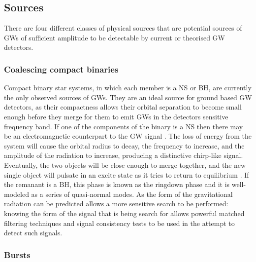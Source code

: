 \documentclass[binding=0.6cm, LaM]{sapthesis}
\begin{document}
\subsection{Sources}

	There are four different classes of physical sources 
	that are potential sources of GWs 
	of sufficient amplitude to be detectable 
	by current or theorised GW detectors. 

\subsubsection{Coalescing compact binaries}

	Compact binary star systems, in which each member is a NS or BH, 
	are currently the only observed sources of GWs.
	They are an ideal source for ground based GW detectors, 
	as their compactness allows their orbital separation to become 
	small enough before they merge for them to emit GWs in the detectors sensitive frequency band.
	If one of the components of the binary is a NS 
	then there may be an electromagnetic counterpart to the GW signal \cite{20}. 
	The loss of energy from the system will cause the orbital radius to decay, 
	the frequency to increase, and the amplitude of the radiation to increase, 
	producing a distinctive chirp-like signal. 
	Eventually, the two objects will be close enough to merge together, 
	and the new single object will pulsate in an excite state as it tries to return to equilibrium \cite{21}. 
	If the remanant is a BH, this phase is known as the ringdown phase and it is well-modeled as a series of quasi-normal modes. 
	As the form of the gravitational radiation can be predicted allows 
	a more sensitive search to be performed: knowing the form of the signal 
	that is being search for allows powerful matched filtering techniques 
	and signal consistency tests to be used in the attempt to detect such signals.


\subsubsection{Bursts}
\end{document}
